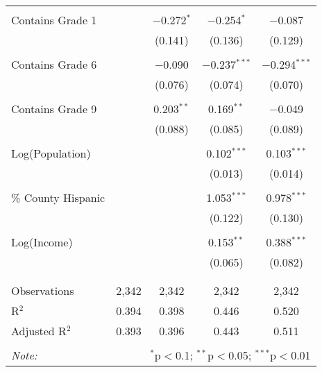 \begin{table}[!htbp]
\begin{tabular}{@{\extracolsep{-2pt}}lcccc}
  & & & & \\ 
 Contains Grade 1 &  & $-$0.272$^{*}$ & $-$0.254$^{*}$ & $-$0.087 \\ 
  &  & (0.141) & (0.136) & (0.129) \\ 
  & & & & \\ 
 Contains Grade 6 &  & $-$0.090 & $-$0.237$^{***}$ & $-$0.294$^{***}$ \\ 
  &  & (0.076) & (0.074) & (0.070) \\ 
  & & & & \\ 
 Contains Grade 9 &  & 0.203$^{**}$ & 0.169$^{**}$ & $-$0.049 \\ 
  &  & (0.088) & (0.085) & (0.089) \\ 
  & & & & \\ 
 Log(Population) &  &  & 0.102$^{***}$ & 0.103$^{***}$ \\ 
  &  &  & (0.013) & (0.014) \\ 
  & & & & \\ 
 \% County Hispanic &  &  & 1.053$^{***}$ & 0.978$^{***}$ \\ 
  &  &  & (0.122) & (0.130) \\ 
  & & & & \\ 
 Log(Income) &  &  & 0.153$^{**}$ & 0.388$^{***}$ \\ 
  &  &  & (0.065) & (0.082) \\ 
  & & & & \\ 
\hline \\[-1.8ex] 
Observations & 2,342 & 2,342 & 2,342 & 2,342 \\ 
R$^{2}$ & 0.394 & 0.398 & 0.446 & 0.520 \\ 
Adjusted R$^{2}$ & 0.393 & 0.396 & 0.443 & 0.511 \\ 
\hline 
\hline \\[-1.8ex] 
\textit{Note:}  & \multicolumn{4}{r}{$^{*}$p$<$0.1; $^{**}$p$<$0.05; $^{***}$p$<$0.01} \\ 
\end{tabular} 
\end{table} 
